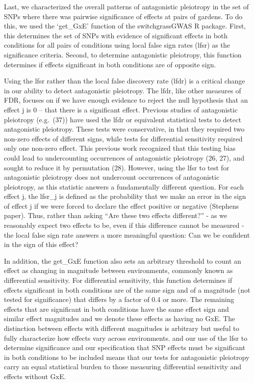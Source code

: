 \documentclass[
  9pt,
  twocolumn,
  twoside]{pnas-new}
\begin{document}
Last, we characterized the overall patterns of antagonistic pleiotropy
in the set of SNPs where there was pairwise significance of effects at
pairs of gardens. To do this, we used the `get\_GxE' function of the
switchgrassGWAS R package. First, this determines the set of SNPs with
evidence of significant effects in both conditions for all pairs of
conditions using local false sign rates (lfsr) as the significance
criteria. Second, to determine antagonistic pleiotropy, this function
determines if effects significant in both conditions are of opposite
sign.

Using the lfsr rather than the local false discovery rate (lfdr) is a
critical change in our ability to detect antagonistic pleiotropy. The
lfdr, like other measures of FDR, focuses on if we have enough evidence
to reject the null hypothesis that an effect j is 0 -- that there is a
significant effect. Previous studies of antagonistic pleiotropy
(e.g.~(37)) have used the lfdr or equivalent statistical tests to detect
antagonistic pleiotropy. These tests were conservative, in that they
required two non-zero effects of different signs, while tests for
differential sensitivity required only one non-zero effect. This
previous work recognized that this testing bias could lead to
undercounting occurrences of antagonistic pleiotropy (26, 27), and
sought to reduce it by permutation (28). However, using the lfsr to test
for antagonistic pleiotropy does not undercount occurrences of
antagonistic pleiotropy, as this statistic answers a fundamentally
different question. For each effect j, the lfsr\_j is defined as the
probability that we make an error in the sign of effect j if we were
forced to declare the effect positive or negative (Stephens paper).
Thus, rather than asking ``Are these two effects different?'' - as we
reasonably expect two effects to be, even if this difference cannot be
measured - the local false sign rate answers a more meaningful question:
Can we be confident in the sign of this effect?

In addition, the get\_GxE function also sets an arbitrary threshold to
count an effect as changing in magnitude between environments, commonly
known as differential sensitivity. For differential sensitivity, this
function determines if effects significant in both conditions are of the
same sign and of a magnitude (not tested for significance) that differs
by a factor of 0.4 or more. The remaining effects that are significant
in both conditions have the same effect sign and similar effect
magnitudes and we denote these effects as having no GxE. The distinction
between effects with different magnitudes is arbitrary but useful to
fully characterize how effects vary across environments. and our use of
the lfsr to determine significance and our specification that SNP
effects must be significant in both conditions to be included means that
our tests for antagonistic pleiotropy carry an equal statistical burden
to those measuring differential sensitivity and effects without GxE.
\end{document}
